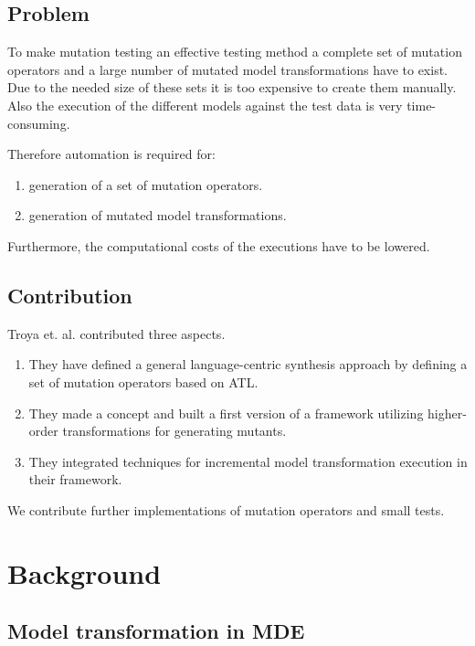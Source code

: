 \documentclass{llncs}
\begin{document}
\subsection{Problem}

To make mutation testing an effective testing method a complete set of mutation
operators and a large number of mutated model transformations have to exist. Due
to the needed size of these sets it is too expensive to create them manually.
Also the execution of the different models against the test data is very time-consuming.

Therefore automation is required for:

\begin{enumerate}
	\item generation of a set of mutation operators.
	\item generation of mutated model transformations.
\end{enumerate}

Furthermore, the computational costs of the executions have to be lowered.

\subsection{Contribution}

Troya et. al. \cite{troya:2015} contributed three aspects.

\begin{enumerate}
	\item They have defined a general language-centric synthesis approach by defining a set of mutation operators based on ATL. 
	\item They made a concept and built a first version of a framework utilizing
	higher-order transformations for generating mutants.\cite{Paige:2009}
	\item They integrated techniques\cite{Bergmayr:2014} for incremental model transformation execution in their framework.
\end{enumerate}

We contribute further implementations of mutation operators and small tests.

\section{Background}

\subsection{Model transformation in MDE}
\end{document}
